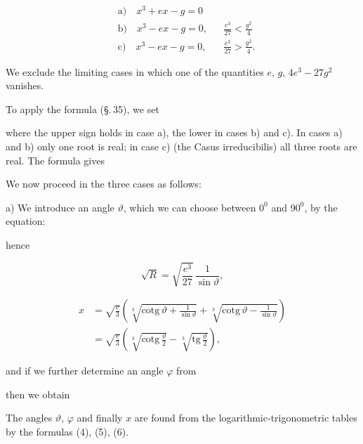 
\[
\begin{aligned}
&\text{a)}\quad x^3 + e x - g = 0\\
&\text{b)}\quad x^3 - e x - g = 0, &&\frac{e^3}{27} < \frac{g^2}{4}\\
&\text{c)}\quad x^3 - e x - g = 0, &&\frac{e^3}{27} > \frac{g^2}{4}.
\end{aligned}
\]

We exclude the limiting cases in which one of the quantities $e$, $g$, $4e^3 - 27g^2$ vanishes.

To apply the  formula (\S.\,35), we set


where the upper sign holds in case a), the lower in cases b) and c). In cases a) and b) only one root is real; in case c) (the Casus irreducibilis) all three roots are real. The  formula gives


We now proceed in the three cases as follows:

a) We introduce an angle $\vartheta$, which we can choose between $0^0$ and $90^0$, by the equation:


hence

\[
\sqrt{R} = \sqrt{\frac{e^3}{27}}\,\frac{1}{\sin\vartheta},
\]

\[
\begin{aligned}
x &= \sqrt{\frac{e}{3}}\left(\sqrt[3]{\mathrm{cotg}\,\vartheta + \frac{1}{\sin\vartheta}} + \sqrt[3]{\mathrm{cotg}\,\vartheta - \frac{1}{\sin\vartheta}}\right)\\
&= \sqrt{\frac{e}{3}}\left(\sqrt[3]{\mathrm{cotg}\,\frac{\vartheta}{2}} - \sqrt[3]{\mathrm{tg}\,\frac{\vartheta}{2}}\right),
\end{aligned}
\]

and if we further determine an angle $\varphi$ from


then we obtain


The angles $\vartheta$, $\varphi$ and finally $x$ are found from the logarithmic-trigonometric tables by the formulas (4), (5), (6).
